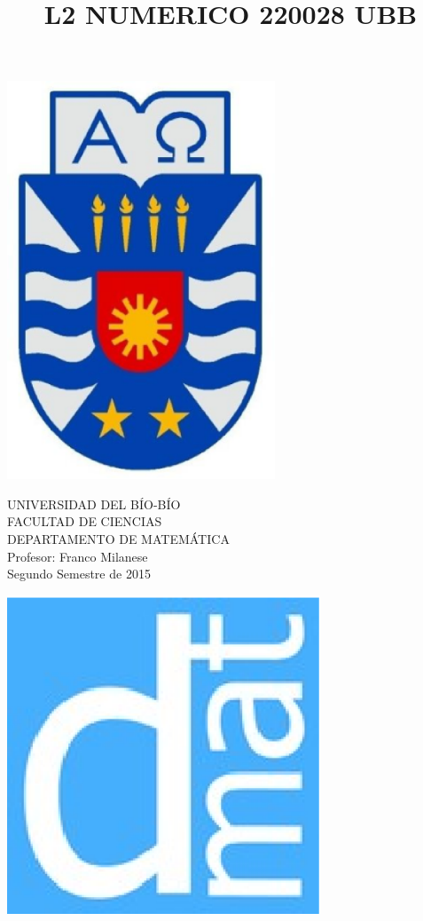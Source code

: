\documentclass[11pt]{article}
\begin{document}
\title{L2 NUMERICO 220028 UBB}

{\begin{minipage}{2cm}
\hspace*{1cm}\includegraphics[width=0.6\textwidth]{escubo-ubb.eps}
\end{minipage}
\begin{minipage}{12cm}
\small
{\bf \rm 
{
\begin{center}
{\footnotesize UNIVERSIDAD DEL B\'IO-B\'IO} \\
{\scriptsize FACULTAD DE CIENCIAS}  \\
{\scriptsize DEPARTAMENTO DE MATEM\'ATICA}  \\
{\scriptsize Profesor:  Franco Milanese}\\
{\scriptsize Segundo Semestre de 2015}
\end{center}
}}
\end{minipage}}
{\begin{minipage}{2cm}
\hspace*{-0.5cm}\vspace*{-0.05cm}\includegraphics[width=0.7\textwidth]{escudo-dmat.eps}
\end{minipage}}
\end{document}
